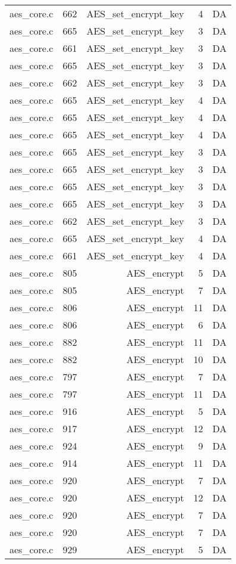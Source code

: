 \begin{table}[h]
{\begin{tabular}{clrrr}
aes\_core.c&662&AES\_set\_encrypt\_key&4 &DA\\
aes\_core.c&665&AES\_set\_encrypt\_key&3 &DA\\
aes\_core.c&661&AES\_set\_encrypt\_key&3 &DA\\
aes\_core.c&665&AES\_set\_encrypt\_key&3 &DA\\
aes\_core.c&662&AES\_set\_encrypt\_key&3 &DA\\
aes\_core.c&665&AES\_set\_encrypt\_key&4 &DA\\
aes\_core.c&665&AES\_set\_encrypt\_key&4 &DA\\
aes\_core.c&665&AES\_set\_encrypt\_key&4 &DA\\
aes\_core.c&665&AES\_set\_encrypt\_key&3 &DA\\
aes\_core.c&665&AES\_set\_encrypt\_key&3 &DA\\
aes\_core.c&665&AES\_set\_encrypt\_key&3 &DA\\
aes\_core.c&665&AES\_set\_encrypt\_key&3 &DA\\
aes\_core.c&662&AES\_set\_encrypt\_key&3 &DA\\
aes\_core.c&665&AES\_set\_encrypt\_key&4 &DA\\
aes\_core.c&661&AES\_set\_encrypt\_key&4 &DA\\
aes\_core.c&805&AES\_encrypt&5 &DA\\
aes\_core.c&805&AES\_encrypt&7 &DA\\
aes\_core.c&806&AES\_encrypt&11&DA\\
aes\_core.c&806&AES\_encrypt&6 &DA\\
aes\_core.c&882&AES\_encrypt&11&DA\\
aes\_core.c&882&AES\_encrypt&10&DA\\
aes\_core.c&797&AES\_encrypt&7 &DA\\
aes\_core.c&797&AES\_encrypt&11&DA\\
aes\_core.c&916&AES\_encrypt&5 &DA\\
aes\_core.c&917&AES\_encrypt&12&DA\\
aes\_core.c&924&AES\_encrypt&9 &DA\\
aes\_core.c&914&AES\_encrypt&11&DA\\
aes\_core.c&920&AES\_encrypt&7 &DA\\
aes\_core.c&920&AES\_encrypt&12&DA\\
aes\_core.c&920&AES\_encrypt&7 &DA\\
aes\_core.c&920&AES\_encrypt&7 &DA\\
aes\_core.c&929&AES\_encrypt&5 &DA\\

\end{tabular}}
\end{table}
